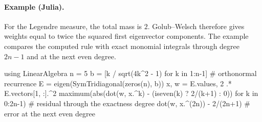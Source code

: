 \paragraph{Example (Julia).} For the Legendre measure, the total mass is $2$. Golub--Welsch therefore gives weights equal to twice the squared first eigenvector components. The example compares the computed rule with exact monomial integrals through degree $2n-1$ and at the next even degree.

\begin{juliacode}
using LinearAlgebra
n = 5
b = [k / sqrt(4k^2 - 1) for k in 1:n-1]        # orthonormal recurrence
E = eigen(SymTridiagonal(zeros(n), b))
x, w = E.values, 2 .* E.vectors[1, :].^2
maximum(abs(dot(w, x.^k) - (iseven(k) ? 2/(k+1) : 0)) for k in 0:2n-1)
                                               # residual through the exactness degree
dot(w, x.^(2n)) - 2/(2n+1)                     # error at the next even degree
\end{juliacode}

